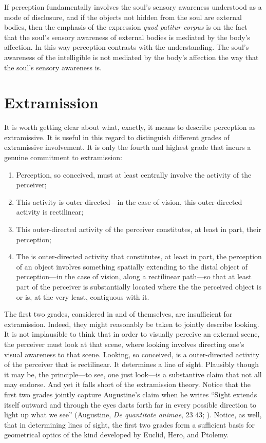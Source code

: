 \documentclass[12pt]{article}
\begin{document}
If perception fundamentally involves the soul's sensory awareness understood as a mode of disclosure, and if the objects not hidden from the soul are external bodies, then the emphasis of the expression \emph{quod patitur corpus} is on the fact that the soul's sensory awareness of external bodies is mediated by the body's affection. In this way perception contrasts with the understanding. The soul's awareness of the intelligible is not mediated by the body's affection the way that the soul's sensory awareness is.


\section{Extramission} %
\label{sec:extramission}

It is worth getting clear about what, exactly, it means to describe perception as extramissive. It is useful in this regard to distinguish different grades of extramissive involvement. It is only the fourth and highest grade that incurs a genuine commitment to extramission:
\begin{enumerate}[(1)]
	\item Perception, so conceived, must at least centrally involve the activity of the perceiver;
	\item This activity is outer directed---in the case of vision, this outer-directed activity is rectilinear;
	\item This outer-directed activity of the perceiver constitutes, at least in part, their perception;
	\item The is outer-directed activity that constitutes, at least in part, the perception of an object involves something spatially extending to the distal object of perception---in the case of vision, along a rectilinear path---so that at least part of the perceiver is substantially located where the the perceived object is or is, at the very least, contiguous with it.
\end{enumerate}

The first two grades, considered in and of themselves, are insufficient for extramission. Indeed, they might reasonably be taken to jointly describe looking. It is not implausible to think that in order to visually perceive an external scene, the perceiver must look at that scene, where looking involves directing one's visual awareness to that scene. Looking, so conceived, is a outer-directed activity of the perceiver that is rectilinear. It determines a line of sight. Plausibly though it may be, the principle---to see, one just look---is a substantive claim that not all may endorse. And yet it falls short of the extramission theory. Notice that the first two grades jointly capture Augustine's claim when he writes ``Sight extends itself outward and through the eyes darts forth far in every possible direction to light up what we see'' (Augustine, \emph{De quantitate animae}, 23 43; \citealt[66]{Colleran:1949ys}). Notice, as well, that in determining lines of sight, the first two grades form a sufficient basis for geometrical optics of the kind developed by Euclid, Hero, and Ptolemy. 
\end{document}
